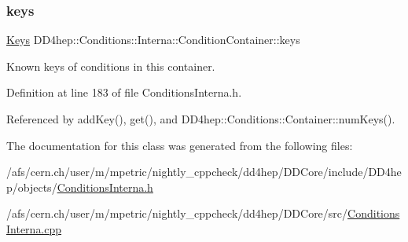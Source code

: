 \subsubsection{\texorpdfstring{keys}{keys}}
{\footnotesize\ttfamily \hyperlink{class_d_d4hep_1_1_conditions_1_1_interna_1_1_condition_container_a01f9461850ee260a6c76646f9619c8bb}{Keys} D\+D4hep\+::\+Conditions\+::\+Interna\+::\+Condition\+Container\+::keys}



Known keys of conditions in this container. 



Definition at line 183 of file Conditions\+Interna.\+h.



Referenced by add\+Key(), get(), and D\+D4hep\+::\+Conditions\+::\+Container\+::num\+Keys().



The documentation for this class was generated from the following files\+:\begin{DoxyCompactItemize}
\item 
/afs/cern.\+ch/user/m/mpetric/nightly\+\_\+cppcheck/dd4hep/\+D\+D\+Core/include/\+D\+D4hep/objects/\hyperlink{_d_d_core_2include_2_d_d4hep_2objects_2_conditions_interna_8h}{Conditions\+Interna.\+h}\item 
/afs/cern.\+ch/user/m/mpetric/nightly\+\_\+cppcheck/dd4hep/\+D\+D\+Core/src/\hyperlink{_d_d_core_2src_2_conditions_interna_8cpp}{Conditions\+Interna.\+cpp}\end{DoxyCompactItemize}

